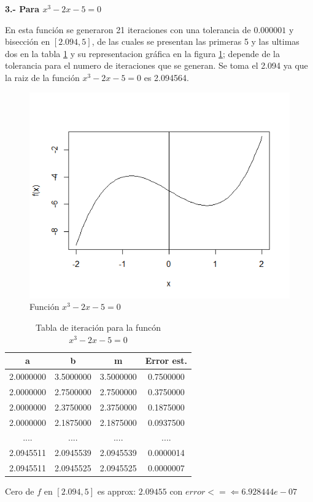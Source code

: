 \documentclass[12pt,a4paper]{article}
\begin{document}
\textbf{3.- Para $x^3-2x-5=0$}

En esta función se generaron 21 iteraciones con una tolerancia de $0.000001$ y bisección en $[2.094,5]$, de las cuales se presentan las primeras 5 y las ultimas dos en la tabla \ref{Figura3} y su representacion gráfica en la figura \ref{fig:Funcion3}; depende de la tolerancia para el numero de iteraciones que se generan.
Se toma el 2.094 ya que la raiz de la función $x^3-2x-5=0$ es 2.094564. 

\begin{figure}[ht]
\centering
\includegraphics[scale=0.6]{Funcion3}
\caption{Función $x^3-2x-5=0$}
\label{fig:Funcion3}
\end{figure}

\begin{table}[ht]
\centering
\begin{tabular}{|c|c|c|c|}
\hline
a         & b         & m         & Error est. \\ \hline
2.0000000 & 3.5000000 & 3.5000000 & 0.7500000  \\ \hline
2.0000000 & 2.7500000 & 2.7500000 & 0.3750000  \\ \hline
2.0000000 & 2.3750000 & 2.3750000 & 0.1875000  \\ \hline
2.0000000 & 2.1875000 & 2.1875000 & 0.0937500  \\ \hline
....      & ....      & ....      & ....       \\ \hline
2.0945511 & 2.0945539 & 2.0945539 & 0.0000014  \\ \hline
2.0945511 & 2.0945525 & 2.0945525 & 0.0000007  \\ \hline
\end{tabular}
\caption{Tabla de iteración para la funcón $x^3-2x-5=0$}
\label{Figura3}
\end{table}

Cero de $f$ en $[2.094 , 5]$ es approx:  $2.09455$ con $error <=\Leftarrow 6.928444e-07$




\end{document}
